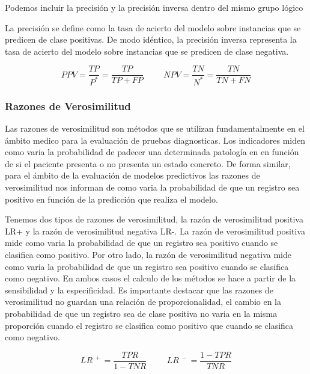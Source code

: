 Podemos incluir la precisión y la precisión inversa dentro del mismo grupo lógico 

La precisión se define como la tasa de acierto del modelo sobre instancias que se predicen de clase positivas. De modo idéntico, la precisión inversa representa la tasa de acierto del modelo sobre instancias que se predicen de clase negativa.


\bigbreak
\begin{equation}\tag*{}
    PPV = \frac{TP}{P^{*}} = \frac{TP}{TP+FP}
    \hspace{1cm}
    NPV = \frac{TN}{N^{*}} = \frac{TN}{TN+FN}
\end{equation}


\subsubsection{Razones de Verosimilitud}

Las razones de verosimilitud son métodos que se utilizan fundamentalmente en el ámbito medico para la evaluación de pruebas diagnosticas. Los indicadores miden como varia la probabilidad de padecer una determinada patología en en función de si el paciente presenta o no presenta un estado concreto. De forma similar, para el ámbito de la evaluación de modelos predictivos las razones de verosimilitud nos informan de como varia la probabilidad de que un registro sea positivo en función de la predicción que realiza el modelo.

\bigbreak

Tenemos dos tipos de razones de verosimilitud, la razón de verosimilitud positiva LR+ y la razón de verosimilitud negativa LR-. La razón de verosimilitud positiva mide como varia la probabilidad de que un registro sea positivo cuando se clasifica como positivo. Por otro lado, la razón de verosimilitud negativa mide como varia la probabilidad de que un registro sea positivo cuando se clasifica como negativo. En ambos casos el calculo de los métodos se hace a partir de la sensibilidad y la especificidad. Es importante destacar que las razones de verosimilitud no guardan una relación de proporcionalidad, el cambio en la probabilidad de que un registro sea de clase positiva no varia en la misma proporción cuando el registro se clasifica como positivo que cuando se clasifica como negativo.

\bigbreak

\begin{equation}\tag*{}
    LR^{\phantom{.}+}    = \frac{TPR}{1-TNR}
    \hspace{1cm}
    LR^{\phantom{.}-} = \frac{1-TPR}{TNR}
\end{equation}
\bigbreak

